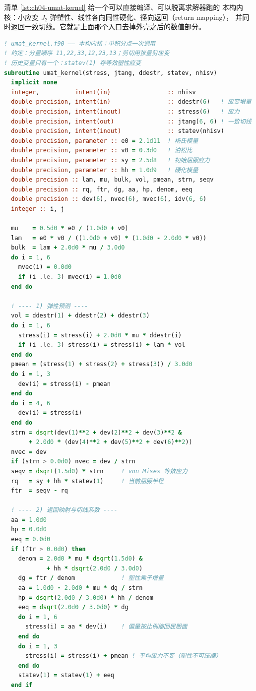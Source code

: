 \documentclass[12pt,a4paper,fontset=fandol]{ctexbook}
\newcommand{\Lang}[1]{\textsf{#1}}
\begin{document}
清单 \ref{lst:ch04-umat-kernel} 给一个可以直接编译、可以脱离求解器跑的
本构内核：小应变 $J_2$ 弹塑性、线性各向同性硬化、径向返回（return mapping），
并同时返回一致切线。它就是上面那个入口去掉外壳之后的数值部分。

\begin{lstlisting}[language=Fortran, style=fortranstyle, caption={用户材料内核骨架：J2 径向返回 + 一致切线（\Lang{Fortran} 自由格式）}, label={lst:ch04-umat-kernel}]
! umat_kernel.f90 —— 本构内核：单积分点一次调用
! 约定：分量顺序 11,22,33,12,23,13；剪切用张量剪应变
! 历史变量只有一个：statev(1) 存等效塑性应变
subroutine umat_kernel(stress, jtang, ddestr, statev, nhisv)
  implicit none
  integer,          intent(in)                :: nhisv
  double precision, intent(in)                :: ddestr(6)   ! 应变增量
  double precision, intent(inout)             :: stress(6)   ! 应力
  double precision, intent(out)               :: jtang(6, 6) ! 一致切线
  double precision, intent(inout)             :: statev(nhisv)
  double precision, parameter :: e0 = 2.1d11  ! 杨氏模量
  double precision, parameter :: v0 = 0.3d0   ! 泊松比
  double precision, parameter :: sy = 2.5d8   ! 初始屈服应力
  double precision, parameter :: hh = 1.0d9   ! 硬化模量
  double precision :: lam, mu, bulk, vol, pmean, strn, seqv
  double precision :: rq, ftr, dg, aa, hp, denom, eeq
  double precision :: dev(6), nvec(6), mvec(6), idv(6, 6)
  integer :: i, j

  mu    = 0.5d0 * e0 / (1.0d0 + v0)
  lam   = e0 * v0 / ((1.0d0 + v0) * (1.0d0 - 2.0d0 * v0))
  bulk  = lam + 2.0d0 * mu / 3.0d0
  do i = 1, 6
    mvec(i) = 0.0d0
    if (i .le. 3) mvec(i) = 1.0d0
  end do

  ! ---- 1) 弹性预测 ----
  vol = ddestr(1) + ddestr(2) + ddestr(3)
  do i = 1, 6
    stress(i) = stress(i) + 2.0d0 * mu * ddestr(i)
    if (i .le. 3) stress(i) = stress(i) + lam * vol
  end do
  pmean = (stress(1) + stress(2) + stress(3)) / 3.0d0
  do i = 1, 3
    dev(i) = stress(i) - pmean
  end do
  do i = 4, 6
    dev(i) = stress(i)
  end do
  strn = dsqrt(dev(1)**2 + dev(2)**2 + dev(3)**2 &
       + 2.0d0 * (dev(4)**2 + dev(5)**2 + dev(6)**2))
  nvec = dev
  if (strn > 0.0d0) nvec = dev / strn
  seqv = dsqrt(1.5d0) * strn     ! von Mises 等效应力
  rq   = sy + hh * statev(1)     ! 当前屈服半径
  ftr  = seqv - rq

  ! ---- 2) 返回映射与切线系数 ----
  aa = 1.0d0
  hp = 0.0d0
  eeq = 0.0d0
  if (ftr > 0.0d0) then
    denom = 2.0d0 * mu * dsqrt(1.5d0) &
            + hh * dsqrt(2.0d0 / 3.0d0)
    dg = ftr / denom             ! 塑性乘子增量
    aa = 1.0d0 - 2.0d0 * mu * dg / strn
    hp = dsqrt(2.0d0 / 3.0d0) * hh / denom
    eeq = dsqrt(2.0d0 / 3.0d0) * dg
    do i = 1, 6
      stress(i) = aa * dev(i)    ! 偏量按比例缩回屈服面
    end do
    do i = 1, 3
      stress(i) = stress(i) + pmean ! 平均应力不变（塑性不可压缩）
    end do
    statev(1) = statev(1) + eeq
  end if


\end{lstlisting}
\end{document}
